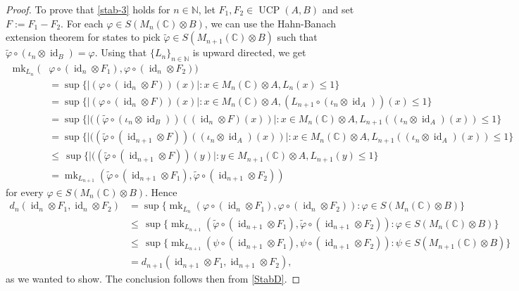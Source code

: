 \documentclass[11pt, a4paper, oneside, final, reqno]{amsart}
\newcommand{\bbN}{\mathbb{N}}
\newcommand{\bbC}{\mathbb{C}}
\newcommand{\UCP}{\operatorname{UCP}}
\newcommand{\id}{\operatorname{id}}
\newcommand{\mk}{\operatorname{mk}}
\theoremstyle{definition}
\theoremstyle{plain}
\theoremstyle{remark}
\numberwithin{equation}{section}
\begin{document}
\begin{proof}
    To prove that \eqref{stab-3} holds for $n\in \bbN$, let  $F_1, F_2 \in \UCP(A, B)$ and set $F:=F_1-F_2$. For each $\varphi \in S(M_n(\bbC)\otimes B)$, we can use the Hahn-Banach extension theorem for states \cite[Theorem 3.3.8]{Murphy1990} to pick $\widetilde\varphi  \in S(M_{n+1}(\bbC)\otimes B)$ such that $\widetilde\varphi \circ (\iota_n\otimes \id_B) = \varphi$. Using that $\{L_n\}_{n\in \bbN}$ is upward directed, we get
    \begin{align*}
        \mk_{L_n}(&\varphi\circ (\id_n\otimes F_1), \varphi\circ (\id_n\otimes F_2)) \\
        & = \sup\big\{ \big| (\varphi\circ (\id_n\otimes F))(x)\big| : x \in M_n(\bbC)\otimes A, L_n(x)\leq 1\big\}\\
        & = \sup\big\{ \big| (\varphi\circ (\id_n\otimes F))(x)\big| : x \in M_n(\bbC)\otimes A, (L_{n+1}\circ (\iota_n\otimes \id_A))(x)\leq 1\big\}\\
        & =  \sup\big\{ \big| ((\widetilde\varphi\circ (\iota_{n}\otimes \id_B)) ((\id_n\otimes F)(x))\big| : x \in M_n(\bbC)\otimes A, L_{n+1}((\iota_n\otimes \id_A)(x))\leq 1\big\}\\
        & =  \sup\big\{ \big| ((\widetilde\varphi\circ (\id_{n+1}\otimes F)) ((\iota_n\otimes \id_A)(x))\big| : x \in M_n(\bbC)\otimes A, L_{n+1}((\iota_n\otimes \id_A)(x))\leq 1\big\}\\
        & \leq \, \sup\big\{ \big| ((\widetilde\varphi\circ (\id_{n+1}\otimes F)) (y)\big| : y \in M_{n+1}(\bbC)\otimes A, L_{n+1}(y)\leq 1\big\}\\
        & = \mk_{L_{n+1}}(\widetilde\varphi\circ (\id_{n+1}\otimes F_1), \widetilde\varphi\circ (\id_{n+1}\otimes F_2))
    \end{align*}
    for every $\varphi\in S(M_n(\bbC)\otimes B)$. Hence
    \begin{align*}
        d_n(\id_n\otimes F_1, \id_n\otimes F_2) &= \sup\{ \mk_{L_n}(\varphi\circ (\id_n\otimes F_1), \varphi\circ (\id_n\otimes F_2)) : \varphi \in S(M_n(\bbC)\otimes B)\} \\
        & \leq\,\sup\{ \mk_{L_{n+1}}(\widetilde\varphi\circ (\id_{n+1}\otimes F_1), \widetilde\varphi\circ (\id_{n+1}\otimes F_2)) : \varphi \in S(M_n(\bbC)\otimes B)\}\\
        & \leq\,\sup\{ \mk_{L_{n+1}}(\psi \circ (\id_{n+1}\otimes F_1), \psi \circ (\id_{n+1}\otimes F_2)) : \psi \in S(M_{n+1}(\bbC)\otimes B)\}\\
        & = d_{n+1}(\id_{n+1}\otimes F_1, \id_{n+1}\otimes F_2),
    \end{align*}
    as we wanted to show. The conclusion follows then from \cref{StabD}.
\end{proof}
\end{document}
